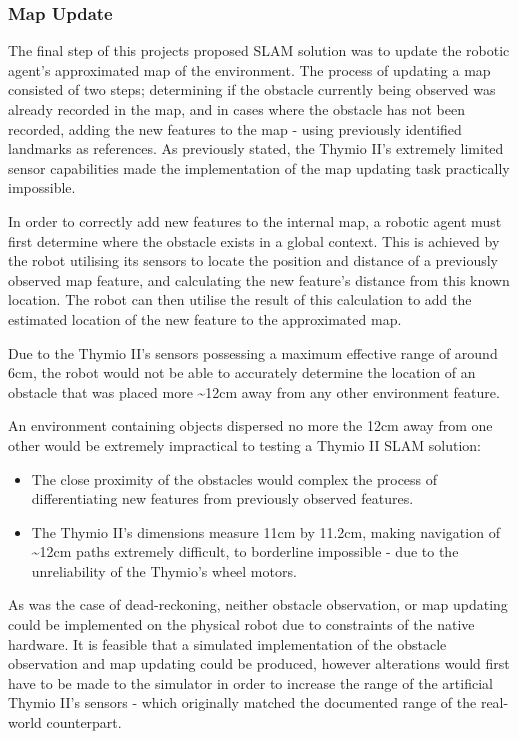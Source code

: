 \subsubsection{Map Update}
The final step of this projects proposed SLAM solution was to update the
robotic agent's approximated map of the environment.
The process of updating a map consisted of two steps; determining if the
obstacle currently being observed was already recorded in the map, and in cases
where the obstacle has not been recorded, adding the new features to the map -
using previously identified landmarks as references. 
As previously stated, the Thymio II's extremely limited sensor capabilities
made the implementation of the map updating task practically impossible.

In order to correctly add new features to the internal map, a robotic agent
must first determine where the obstacle exists in a global context.
This is achieved by the robot utilising its sensors to locate the position
and distance of a previously observed map feature, and calculating the new
feature's distance from this known location.
The robot can then utilise the result of this calculation to add the estimated
location of the new feature to the approximated map.

Due to the Thymio II's sensors possessing a maximum effective range of around
6cm, the robot would not be able to accurately determine the location of an
obstacle that was placed more \~{}12cm away from any other environment feature.

An environment containing objects dispersed no more the 12cm away from one
other would be extremely impractical to testing a Thymio II SLAM solution:
\begin{itemize}
\item The close proximity of the obstacles would complex the process of
differentiating new features from previously observed features.
\item The Thymio II's dimensions measure 11cm by 11.2cm, making navigation of
\~{}12cm paths extremely difficult, to borderline impossible - due to the
unreliability of the Thymio's wheel motors.
\end{itemize}

As was the case of dead-reckoning, neither obstacle observation, or map
updating could be implemented on the physical robot due to constraints of the
native hardware.
It is feasible that a simulated implementation of the obstacle observation and
map updating could be produced, however alterations would first have
to be made to the simulator in order to increase the range of the artificial
Thymio II's sensors - which originally matched the documented range of the
real-world counterpart.


